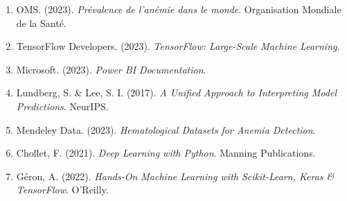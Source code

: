 \documentclass[12pt,a4paper]{article}
\begin{document}
\begin{enumerate}
    \item OMS. (2023). \textit{Prévalence de l'anémie dans le monde}. Organisation Mondiale de la Santé.
    \item TensorFlow Developers. (2023). \textit{TensorFlow: Large-Scale Machine Learning}.
    \item Microsoft. (2023). \textit{Power BI Documentation}.
    \item Lundberg, S. \& Lee, S. I. (2017). \textit{A Unified Approach to Interpreting Model Predictions}. NeurIPS.
    \item Mendeley Data. (2023). \textit{Hematological Datasets for Anemia Detection}.
    \item Chollet, F. (2021). \textit{Deep Learning with Python}. Manning Publications.
    \item Géron, A. (2022). \textit{Hands-On Machine Learning with Scikit-Learn, Keras \& TensorFlow}. O'Reilly.
\end{enumerate}
\end{document}
